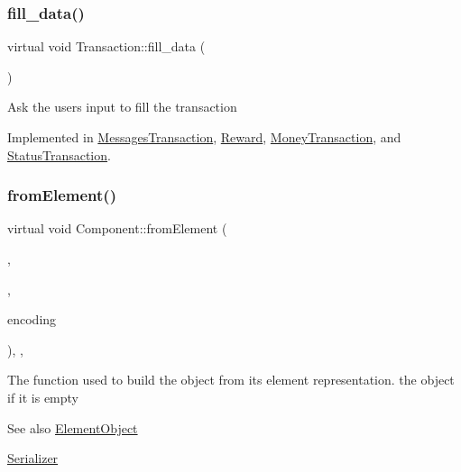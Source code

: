 \mbox{\label{classTransaction_a73b16e3d7e4c24e5b4da203740691e65}} 
\subsubsection{\texorpdfstring{fill\+\_\+data()}{fill\_data()}}
{\footnotesize\ttfamily virtual void Transaction\+::fill\+\_\+data (\begin{DoxyParamCaption}{ }\end{DoxyParamCaption})\hspace{0.3cm}{\ttfamily [pure virtual]}}

Ask the user\textquotesingle{}s input to fill the transaction 

Implemented in \mbox{\hyperlink{classMessagesTransaction_aeca5802e7f1bd57e38468dc3394e2825}{Messages\+Transaction}}, \mbox{\hyperlink{classReward_a30a40e2eefd0aea969fab46d1e22d145}{Reward}}, \mbox{\hyperlink{classMoneyTransaction_a8666737a342f5eb1856006cd970967bf}{Money\+Transaction}}, and \mbox{\hyperlink{classStatusTransaction_a5abd3cf04705bd7cd3f37b628dcf21a4}{Status\+Transaction}}.

\mbox{\label{classComponent_a2ded18881226d0077dc393e0e9304bb1}} 
\subsubsection{\texorpdfstring{from\+Element()}{fromElement()}}
{\footnotesize\ttfamily virtual void Component\+::from\+Element (\begin{DoxyParamCaption}\item[{\mbox{\hyperlink{classElementObject}{Element\+Object}} $\ast$}]{,  }\item[{const \mbox{\hyperlink{classSerializer}{Serializer}} $\ast$}]{,  }\item[{const char $\ast$}]{encoding }\end{DoxyParamCaption})\hspace{0.3cm}{\ttfamily [protected]}, {}, {\ttfamily [inherited]}}

The function used to build the object from its element representation. the object if it is empty \begin{DoxySeeAlso}{See also}
\mbox{\hyperlink{classElementObject}{Element\+Object}} 

\mbox{\hyperlink{classSerializer}{Serializer}}
\end{DoxySeeAlso}

